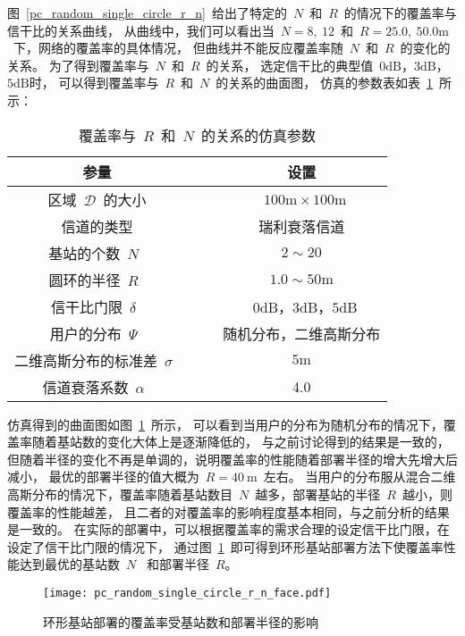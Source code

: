 图~\ref{pc_random_single_circle_r_n}~给出了特定的~$N$~和~$R$~的情况下的覆盖率与信干比的关系曲线，
从曲线中，我们可以看出当~$N=8, ~12$~和~$R=25.0,~50.0\mathrm{m}$~下，网络的覆盖率的具体情况，
但曲线并不能反应覆盖率随~$N$~和~$R$~的变化的关系。
为了得到覆盖率与~$N$~和~$R$~的关系，
选定信干比的典型值~$0\mathrm{dB}$，$3\mathrm{dB}$，$5\mathrm{dB}$时，
可以得到覆盖率与~$R$~和~$N$~的关系的曲面图，
仿真的参数表如表~\ref{pc_random_single_circle_r_n_table}~所示：

\begin{table}[htbp]
\caption{覆盖率与~$R$~和~$N$~的关系的仿真参数}
\label{pc_random_single_circle_r_n_table}
\vspace{0.5em}\centering\wuhao
\begin{tabular}{cccc}
\toprule[1.5pt]
参量 & & & 设置 \\
\midrule[0.5pt]
区域~$\mathcal{D}$~的大小  & & & ~$100\mathrm{m} \times 100 \mathrm{m}$ \\
信道的类型 & & &  瑞利衰落信道\\
基站的个数~$N$~ & & &  $2\sim20$\\
圆环的半径~$R$~ & & &  $1.0\sim 50\mathrm{m}$\\
信干比门限~$\delta$~  & & & ~$0\mathrm{dB}$，$3\mathrm{dB}$，$5\mathrm{dB}$\\
用户的分布~$\Psi$~ & & & 随机分布，二维高斯分布\\
二维高斯分布的标准差~$\sigma$~ & & & ${5\mathrm{m}}$\\
信道衰落系数~$\alpha$~  & & & 4.0\\
\bottomrule[1.5pt]
\end{tabular}
\end{table}

仿真得到的曲面图如图~\ref{pc_random_single_circle_r_n_face}~所示，
可以看到当用户的分布为随机分布的情况下，覆盖率随着基站数的变化大体上是逐渐降低的，
与之前讨论得到的结果是一致的，但随着半径的变化不再是单调的，说明覆盖率的性能随着部署半径的增大先增大后减小，
最优的部署半径的值大概为~$R = 40~\mathrm{m}$~左右。
当用户的分布服从混合二维高斯分布的情况下，覆盖率随着基站数目~$N$~越多，部署基站的半径~$R$~越小，则覆盖率的性能越差，
且二者的对覆盖率的影响程度基本相同，与之前分析的结果是一致的。
在实际的部署中，可以根据覆盖率的需求合理的设定信干比门限，在设定了信干比门限的情况下，
通过图~\ref{pc_random_single_circle_r_n_face}~即可得到环形基站部署方法下使覆盖率性能达到最优的基站数~$N$~
和部署半径~$R$。
\begin{figure}[htbp]
\centering
\texttt{[image: pc\_random\_single\_circle\_r\_n\_face.pdf]}
\caption{环形基站部署的覆盖率受基站数和部署半径的影响}\vspace{-0.5em}
\label{pc_random_single_circle_r_n_face}
\end{figure}


